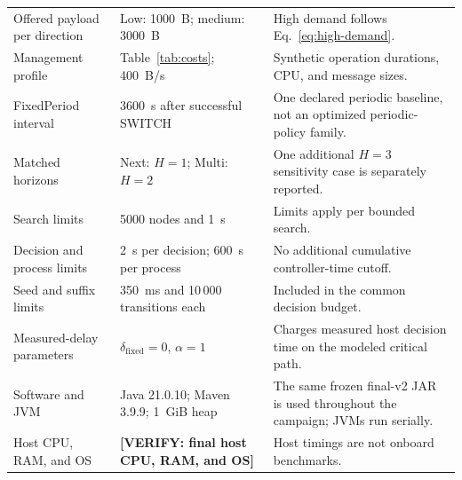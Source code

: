 \documentclass[conference]{IEEEtran}
\newcommand{\authorcheck}[1]{\textbf{[VERIFY: #1]}}
\newcommand{\FinalHostHardware}{%
    \authorcheck{final host CPU, RAM, and OS}%
}
\begin{document}
\begin{table}[!t]
\begin{tabularx}{\textwidth}{
        @{}
        p{}
        p{}
        Y
        @{}
    }
        Offered payload per direction
        &
        Low: 1000~B; medium: 3000~B
        &
        High demand follows Eq.~\eqref{eq:high-demand}.
        \\

        Management profile
        &
        Table~\ref{tab:costs}; 400~B/s
        &
        Synthetic operation durations, CPU, and message sizes.
        \\

        FixedPeriod interval
        &
        3600~s after successful SWITCH
        &
        One declared periodic baseline, not an optimized
        periodic-policy family.
        \\

        Matched horizons
        &
        Next: $H=1$; Multi: $H=2$
        &
        One additional $H=3$ sensitivity case is separately
        reported.
        \\

        Search limits
        &
        5000 nodes and 1~s
        &
        Limits apply per bounded search.
        \\

        Decision and process limits
        &
        2~s per decision; 600~s per process
        &
        No additional cumulative controller-time cutoff.
        \\

        Seed and suffix limits
        &
        350~ms and 10\,000 transitions each
        &
        Included in the common decision budget.
        \\

        Measured-delay parameters
        &
        $\delta_{\mathrm{fixed}}=0$, $\alpha=1$
        &
        Charges measured host decision time on the modeled
        critical path.
        \\

        Software and JVM
        &
        Java 21.0.10; Maven 3.9.9; 1~GiB heap
        &
        The same frozen final-v2 JAR is used throughout
        the campaign; JVMs run serially.
        \\

        Host CPU, RAM, and OS
        &
        \FinalHostHardware
        &
        Host timings are not onboard benchmarks.
        \\

        \bottomrule
    \end{tabularx}
\end{table}
\end{document}
